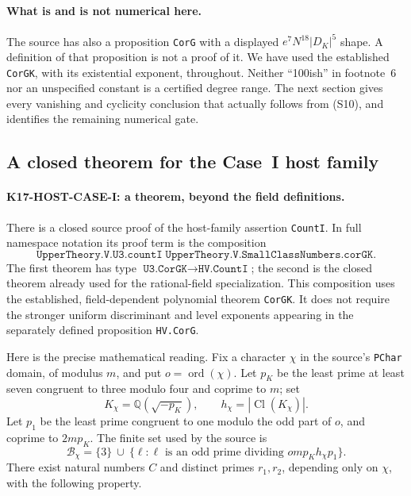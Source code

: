 \documentclass[11pt,a4paper]{article}
\theoremstyle{definition}
\begin{document}
\paragraph{What is and is not numerical here.}
The source has also a proposition \texttt{CorG} with a displayed
$e^7N^{18}|D_K|^5$ shape. A definition of that proposition is not a
proof of it. We have used the established \texttt{CorGK}, with its
existential exponent, throughout. Neither ``100ish'' in footnote~6
nor an unspecified constant is a certified degree range. The next
section gives every vanishing and cyclicity conclusion that actually
follows from (S10), and identifies the remaining numerical gate.

\subsection{A closed theorem for the Case~I host family}
\label{sec:host-case-one}

\paragraph{K17-HOST-CASE-I: a theorem, beyond the field definitions.}
There is a closed source proof of the host-family assertion
\texttt{CountI}.  In full namespace notation its proof term is the
composition
\[
 \texttt{UpperTheory.V.U3.countI}\;
 \texttt{UpperTheory.V.SmallClassNumbers.corGK}.
\]
The first theorem has type
\(\texttt{U3.CorGK}\longrightarrow\texttt{HV.CountI}\);
the second is the closed theorem already used for the rational-field
specialization.  This composition uses the established, field-dependent
polynomial theorem \texttt{CorGK}.  It does not require the stronger
uniform discriminant and level exponents appearing in the separately
defined proposition \texttt{HV.CorG}.

Here is the precise mathematical reading.  Fix a character \(\chi\) in
the source's \texttt{PChar} domain, of modulus \(m\), and put
\(o=\operatorname{ord}(\chi)\).
Let \(p_K\) be the least prime at least seven congruent to three modulo
four and coprime to \(m\); set
\[
 K_\chi=\mathbb Q(\sqrt{-p_K}),\qquad
 h_\chi=|\operatorname{Cl}(K_\chi)|.
\]
Let \(p_1\) be the least prime congruent to one modulo the odd part of
\(o\), and coprime to \(2mp_K\).  The finite set used by the source is
\[
 \mathcal B_\chi=\{3\}\ \cup\
 \{\ell:\ell\text{ is an odd prime dividing }omp_Kh_\chi p_1\}.
\]
There exist natural numbers \(C\) and distinct primes \(r_1,r_2\),
depending only on \(\chi\), with the following property.
\end{document}
